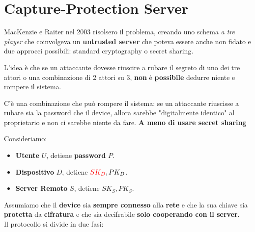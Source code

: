 \section{Capture-Protection Server}
MacKenzie e Raiter nel 2003 risolsero il problema, creando uno schema \textit{a tre player} che coinvolgeva un \textbf{untrusted server} che poteva essere anche non fidato e due approcci possibili: standard cryptography o secret sharing.
\begin{note}
L'idea è che se un attaccante dovesse riuscire a rubare il segreto di uno dei tre attori o una combinazione di 2 attori su 3, \textbf{non} è \textbf{possibile} dedurre niente e rompere il sistema.
\end{note}
\begin{remark}
C'è una combinazione che può rompere il sistema: se un attaccante riuscisse a rubare sia la password che il device, allora sarebbe "digitalmente identico" al proprietario e non ci sarebbe niente da fare. \textbf{A meno di usare secret sharing}
\end{remark}
\begin{definition}\label{def:capserver}
Consideriamo:
\begin{itemize}
    \item \textbf{Utente} $U$, detiene \textbf{password} $P$.
    \item \textbf{Dispositivo} $D$, detiene $\textcolor{red}{SK_D}, PK_D$.
    \item \textbf{Server Remoto} $S$, detiene $SK_S, PK_S$.
\end{itemize}
Assumiamo che il \textbf{device} sia \textbf{sempre connesso} alla \textbf{rete} e che la sua chiave sia \textbf{protetta} da \textbf{cifratura} e che sia decifrabile \textbf{solo cooperando con il server}.\\
Il protocollo si divide in due fasi:
\end{definition}
